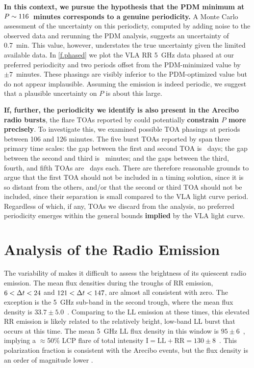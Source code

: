 \documentclass[twocolumn, times]{aastex6}
\begin{document}
\textbf{In this context, we pursue the hypothesis that the PDM minimum at $P
  \sim 116$~minutes corresponds to a genuine periodicity.} A Monte Carlo
assessment of the uncertainty on this periodicty, computed by adding noise to
the observed data and rerunning the PDM analysis, suggests an uncertainty of
0.7~min. This value, however, understates the true uncertainty given the
limited available data. In \autoref{f.phased} we plot the VLA RR 5~GHz data
phased at our preferred periodicity and two periods offset from the
PDM-minimized value by ${\pm}7$~minutes. These phasings are visibly inferior
to the PDM-optimized value but do not appear implausible. Assuming the
emission is indeed periodic, we suggest that a plausible uncertainty on
\textbf{$P$} is about this large.

\textbf{If, further, the periodicity we identify is also present in the
  Arecibo radio bursts}, the flare TOAs reported by \citet{rw16} could
potentially \textbf{constrain $P$ more precisely}. To investigate this, we
examined possible TOA phasings at periods between 106 and 126 minutes. The
five burst TOAs reported by \citet{rw16} span three primary time scales: the
gap between the first and second TOA is ~days; the gap between the
second and third is ~minutes; and the gaps between the third, fourth,
and fifth TOAs are ~days each. There are therefore reasonable grounds to
argue that the first TOA should not be included in a timing solution, since it
is so distant from the others, and/or that the second or third TOA should not
be included, since their separation is small compared to the VLA light curve
period. Regardless of which, if any, TOAs we discard from the analysis, no
preferred periodicity emerges within the general bounds \textbf{implied} by
the VLA light curve.


\section{Analysis of the Radio Emission}
\label{s.radioprops}

The variability of  makes it difficult to assess the brightness
of its quiescent radio emission. The mean flux densities during the troughs of
RR emission, $6 < {\Delta t} < 24$ and $121 < {\Delta t} < 147$, are almost all consistent
with zero. The exception is the 5~GHz sub-band in the second trough, where the
mean flux density is $33.7 \pm 5.0$~\ujy. Comparing to the LL emission at
these times, this elevated RR emission is likely related to the relatively
bright, low-band LL burst that occurs at this time. The mean 5~GHz LL flux
density in this window is $95 \pm 6$~\ujy, implying a $\approx$50\% LCP flare
of total intensity $\text{I} = \text{LL} + \text{RR} = 130 \pm 8$~\ujy. This
polarization fraction is consistent with the Arecibo events, but the flux
density is an order of magnitude lower \citep{rw16}.
\end{document}
